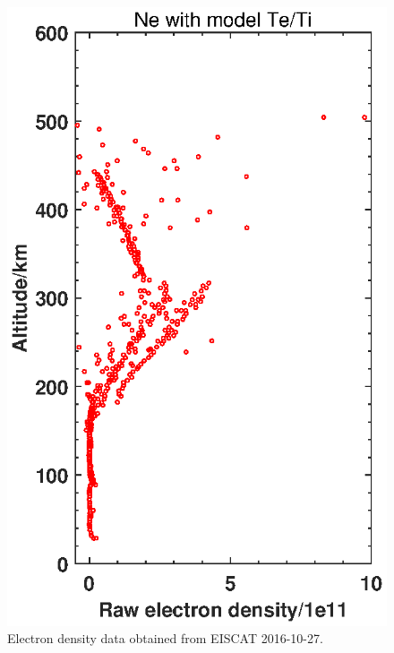 \begin{minipage}{0.45\textwidth}	
	\begin{flushleft}
	\begin{figure}[H]
		\centering
		\includegraphics[width=\textwidth]{figures/rawNe.eps}
		\caption{Electron density data obtained from EISCAT 2016-10-27.}
		\label{fig::NeE}
	\end{figure}
	\end{flushleft}
\end{minipage}
